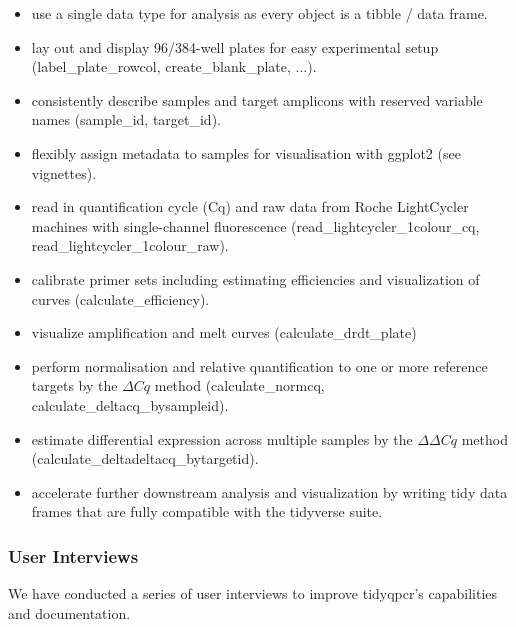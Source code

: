 \documentclass{SBCbookchapter}
\begin{document}
\begin{itemize}
    \item use a single data type for analysis as every object is a tibble / data frame.
    \item lay out and display 96/384-well plates for easy experimental setup (label\_plate\_rowcol, create\_blank\_plate, ...).
    \item consistently describe samples and target amplicons with reserved variable names (sample\_id, target\_id).
    \item flexibly assign metadata to samples for visualisation with ggplot2 (see vignettes).
    \item read in quantification cycle (Cq) and raw data from Roche LightCycler machines with single-channel fluorescence (read\_lightcycler\_1colour\_cq, read\_lightcycler\_1colour\_raw).
    \item calibrate primer sets including estimating efficiencies and visualization of curves (calculate\_efficiency).
    \item visualize amplification and melt curves (calculate\_drdt\_plate)
    \item perform normalisation and relative quantification to one or more reference targets by the $\Delta Cq$ method (calculate\_normcq, calculate\_deltacq\_bysampleid).
    \item estimate differential expression across multiple samples by the $\Delta \Delta Cq$ method (calculate\_deltadeltacq\_bytargetid).
    \item accelerate further downstream analysis and visualization by writing tidy data frames that are fully compatible with the tidyverse suite.

\end{itemize}

\subsubsection{User Interviews}
We have conducted a series of user interviews to improve tidyqpcr's capabilities and documentation.
\end{document}
